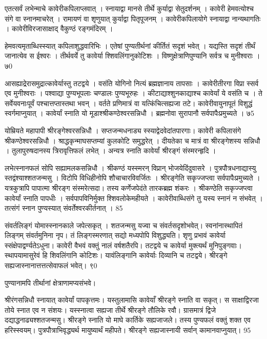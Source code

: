 एतत्सर्वं लभेन्माचे कावेरीकपिलाप्लवात् ।
स्नायाद्वा मानसे तीर्थे कुर्याद्वा सेतुदर्शनम् ।
कावेरी हेमवत्योश्च संगे वा स्नानमाचरेत् ।
रामायणं वा शृणुयात् कुर्याद्वा पितृपूजनम् ।
कावेरीकपिलायोगे स्नायाद्वा नान्यथागतिः ।
कावेरीविरजासाक्षाद् वैकुण्ठं रङ्गमंदिरम् ।

हेमवत्यमृताब्धिस्स्यात् कपिलाशुद्धवारिभिः ।
एतेषां पुण्यतीर्थनां कीर्तितं सदृशं भवेत् ।
यद्यस्ति सदृशं तीर्थं जानात्येव स ईश्वरः ।
तीर्थवर्ये तु कावेर्या श्शिवलिंगानुकोटिशः ।
विष्णुक्षेत्राणिपुण्यानि सर्वत्र च मुनीश्वराः ।
७0

आसह्याद्रेरासमुद्रात्कावेर्यास्तु तटद्वये ।
वसंति योगिनो नित्यं ब्रह्मज्ञानाय तापसाः ।
कावेरीतीरगा विप्रा स्सर्व एव मुनीश्वराः ।
पश्वाद्या पुण्यभूपलाः चण्डालः पुण्यभूरुहः ।
कीटाद्याश्शुनकाद्याश्च कावेर्यां ये वसंति च ।
ते सर्वेयवनाःपूर्वं पश्चात्तप्तास्तथा भवन् ।
वर्तते प्रणिमात्रं वा यत्किंचित्सह्यजा तटे।
कावेरीवायुनापूतं विशुद्धं स्वर्गमाप्नुयात् ।
कावेर्यां स्नाति यो मूडाश्श्रीकण्ठेश्वरसन्निधौ ।
ब्रह्मनोवा सुरापानौ सर्वपापैःप्रमुच्यते ।
७5

योम्रियते महापापी श्रीरङ्गेश्वरसन्निधौ ।
सप्तजन्मधनाड्य स्स्याद्वेदवेदांतपारगाः।
कावेरी कपिलासंगे श्रीकण्ठेश्वरसन्निधौ ।
श्राद्धकृन्माघसप्तम्यां कुलकोटि समुद्धरेत् ।
दीयतेका च मात्रं वा श्रीरङ्गेशस्य सन्निधौ ।
तुलापुरुषदानस्य त्रिरावृत्तिफलं लभेत् ।
अन्यत्र स्नाति कावेर्यां श्रीरङ्गं संस्मरन्हृदि ।

लभेत्स्नानफलं सोपि सह्यामलकसन्निधौ ।
श्रीकण्ठं यस्स्मरन् विप्रान् भोजयेदिंदुवासरे ।
पुत्रपौत्रधनाद्यास्यु स्तद्वंश्याश्शतजन्मसु ।
विटोपि विधिहीनोपि शौचाचारविवर्जितः ।
श्रीरङ्गेति सकृज्जप्त्वा सर्वपापैःप्रमुच्यते ।
यत्रकुत्रापि पापात्मा श्रीरङ्ग संस्मरेत्सदा।
तस्य कर्णेजपेदंते तारकब्रह्म शंकरः ।
श्रीकण्ठेति सकृज्जप्त्वा कावेर्यां स्नाति पापधीः ।
सर्वपापविनिर्मुक्त श्शिवलोकेमहीयते ।
कावेरीवाब्धिसंगे तु यस्य स्नानं न संभवेत् ।
तत्संगं स्नान पुण्यस्यात् संवर्तेश्वरकीर्तनात् ।
85

संवर्तलिङ्गं योमास्स्नानकाले जपेत्सकृत् ।
शतजन्मसु यज्वा च संवर्तसदृशोभवेत्।
स्वनांनास्थापितं लिङ्गम् संवर्तमुनिना नृप।
तं लिङ्गस्मरणात् सद्यो मध्यपोपि विशुद्ध्यति।
शृणु प्रभावं कावेर्या स्संक्षेपाद्वर्ण्यतेऽधुना।
कावेरी वैभवं वक्तुं नालं वर्षशतैरपि।
तटद्वये च कावेर्या मुक्त्यर्थं मुनिपुङ्गवाः।
स्थापयामासुरेवं हि शिवलिंगानि कोटिशः।
यावंलिङ्गानि कावेर्याः दिव्यानि च तटद्वये।
श्रीरङ्गे सह्यजास्नानात्तत्तत्सेवाफलं भवेत्।
९0

पुण्यानामपि तीर्थानां क्षेत्राणामप्यसंभवे।

श्रीरंगसन्निधौ स्नायात् कावेर्यां पापकृत्तमः।
यस्तुलामासि कावेयाँ श्रीरङ्गे स्नाति वा सकृत्।
स साक्षाद्विरजा तोये स्नात एव न संशयः।
यस्स्नात्वा सह्यजा तीर्थे श्रीरङ्गे तौलिके रवौ।
ग्रासमात्रं द्विजे दद्याद्धनाढ्यश्शतजन्मसु।
श्रीरङ्गे स्नाति यो माघे कार्तिके सह्यजाजले।
तस्य पुण्यफलं वक्तुं शक्त एव हरिस्स्वयम्।
पुत्रपौत्राभिवृद्ध्यर्थ मायुष्यार्थं महीपते।
श्रीरङ्गे सह्यजास्नायी सर्वान् कामानवाप्नुयात्।
95

